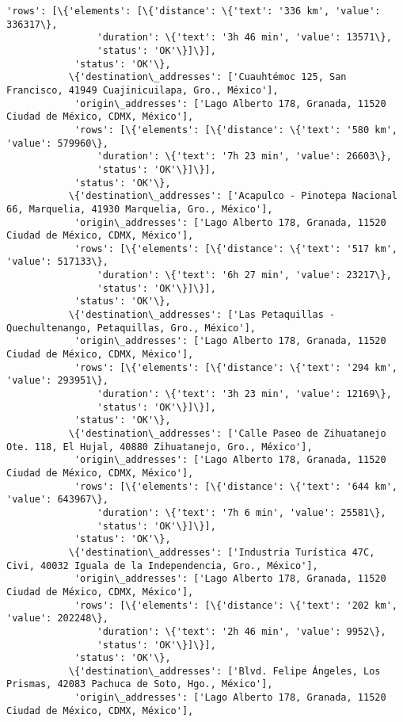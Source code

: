 \documentclass[11pt]{article}
\begin{document}
\begin{Verbatim}[commandchars=\\\{\}]
            'rows': [\{'elements': [\{'distance': \{'text': '336 km', 'value': 336317\},
                'duration': \{'text': '3h 46 min', 'value': 13571\},
                'status': 'OK'\}]\}],
            'status': 'OK'\},
           \{'destination\_addresses': ['Cuauhtémoc 125, San Francisco, 41949 Cuajinicuilapa, Gro., México'],
            'origin\_addresses': ['Lago Alberto 178, Granada, 11520 Ciudad de México, CDMX, México'],
            'rows': [\{'elements': [\{'distance': \{'text': '580 km', 'value': 579960\},
                'duration': \{'text': '7h 23 min', 'value': 26603\},
                'status': 'OK'\}]\}],
            'status': 'OK'\},
           \{'destination\_addresses': ['Acapulco - Pinotepa Nacional 66, Marquelia, 41930 Marquelia, Gro., México'],
            'origin\_addresses': ['Lago Alberto 178, Granada, 11520 Ciudad de México, CDMX, México'],
            'rows': [\{'elements': [\{'distance': \{'text': '517 km', 'value': 517133\},
                'duration': \{'text': '6h 27 min', 'value': 23217\},
                'status': 'OK'\}]\}],
            'status': 'OK'\},
           \{'destination\_addresses': ['Las Petaquillas - Quechultenango, Petaquillas, Gro., México'],
            'origin\_addresses': ['Lago Alberto 178, Granada, 11520 Ciudad de México, CDMX, México'],
            'rows': [\{'elements': [\{'distance': \{'text': '294 km', 'value': 293951\},
                'duration': \{'text': '3h 23 min', 'value': 12169\},
                'status': 'OK'\}]\}],
            'status': 'OK'\},
           \{'destination\_addresses': ['Calle Paseo de Zihuatanejo Ote. 118, El Hujal, 40880 Zihuatanejo, Gro., México'],
            'origin\_addresses': ['Lago Alberto 178, Granada, 11520 Ciudad de México, CDMX, México'],
            'rows': [\{'elements': [\{'distance': \{'text': '644 km', 'value': 643967\},
                'duration': \{'text': '7h 6 min', 'value': 25581\},
                'status': 'OK'\}]\}],
            'status': 'OK'\},
           \{'destination\_addresses': ['Industria Turística 47C, Civi, 40032 Iguala de la Independencia, Gro., México'],
            'origin\_addresses': ['Lago Alberto 178, Granada, 11520 Ciudad de México, CDMX, México'],
            'rows': [\{'elements': [\{'distance': \{'text': '202 km', 'value': 202248\},
                'duration': \{'text': '2h 46 min', 'value': 9952\},
                'status': 'OK'\}]\}],
            'status': 'OK'\},
           \{'destination\_addresses': ['Blvd. Felipe Ángeles, Los Prismas, 42083 Pachuca de Soto, Hgo., México'],
            'origin\_addresses': ['Lago Alberto 178, Granada, 11520 Ciudad de México, CDMX, México'],

\end{Verbatim}
\end{document}
